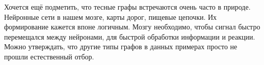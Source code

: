 Хочется ещё подметить, что тесные графы встречаются очень часто в природе.
Нейронные сети в нашем мозге, карты дорог, пищевые цепочки. Их формирование кажется
впоне логичным. Мозгу необходимо, чтобы сигнал быстро перемещался между нейронами,
для быстрой обработки информации и реакции. Можно утверждать, что другие типы графов
в данных примерах просто не прошли естественный отбор.















